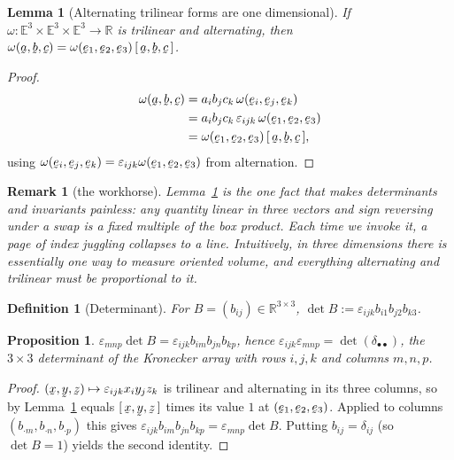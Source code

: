 \documentclass[17pt,a4paper]{extreport}
\DeclareRobustCommand{\vek}[1]{\underaccent{\tilde}{#1}}
\newcommand{\Rn}{\mathbb{R}}
\newcommand{\Et}{\mathbb{E}^{3}}
\newcommand{\ba}{\vek{a}}
\newcommand{\bb}{\vek{b}}
\newcommand{\bc}{\vek{c}}
\newcommand{\bx}{\vek{x}}
\newcommand{\by}{\vek{y}}
\newcommand{\bz}{\vek{z}}
\newcommand{\be}{\vek{e}}
\newcommand{\dd}{\delta}
\newcommand{\eps}{\varepsilon}
\newcommand{\tbox}[3]{[\,#1,#2,#3\,]}
\theoremstyle{scplain}
\newtheorem{proposition}[theorem]{Proposition}
\newtheorem{lemma}[theorem]{Lemma}
\theoremstyle{scdefn}
\newtheorem{definition}[theorem]{Definition}
\newtheorem{remark}[theorem]{Remark}
\theoremstyle{scplain}
\begin{document}
\begin{lemma}[Alternating trilinear forms are one dimensional]\label{lem:altform}
If $\omega:\Et\times\Et\times\Et\to\Rn$ is trilinear and alternating, then
$\omega(\ba,\bb,\bc)=\omega(\be_{1},\be_{2},\be_{3})\,\tbox\ba\bb\bc$.
\end{lemma}

\begin{proof}
\[
\begin{aligned}
\omega(\ba,\bb,\bc)&=a_{i}b_{j}c_{k}\,\omega(\be_{i},\be_{j},\be_{k})\\
&=a_{i}b_{j}c_{k}\,\eps_{ijk}\,\omega(\be_{1},\be_{2},\be_{3})\\
&=\omega(\be_{1},\be_{2},\be_{3})\,\tbox\ba\bb\bc,
\end{aligned}
\]
using
$\omega(\be_{i},\be_{j},\be_{k})=\eps_{ijk}\omega(\be_1,\be_2,\be_3)$ from
alternation.
\end{proof}

\begin{remark}[the workhorse]\label{rem:workhorse}
Lemma~\ref{lem:altform} is the one fact that makes determinants and
invariants painless: \emph{any} quantity linear in three vectors and sign
reversing under a swap is a fixed multiple of the box product. Each time we
invoke it, a page of index juggling collapses to a line. Intuitively, in
three dimensions there is essentially one way to measure oriented volume,
and everything alternating and trilinear must be proportional to it.
\end{remark}

\begin{definition}[Determinant]\label{def:det}
For $B=(b_{ij})\in\Rn^{3\times3}$, $\det B:=\eps_{ijk}b_{i1}b_{j2}b_{k3}$.
\end{definition}

\begin{proposition}\label{prop:detforms}
$\eps_{mnp}\det B=\eps_{ijk}b_{im}b_{jn}b_{kp}$, hence
$\eps_{ijk}\eps_{mnp}=\det(\dd_{\bullet\bullet})$, the $3\times3$
determinant of the Kronecker array with rows $i,j,k$ and
columns $m,n,p$.
\end{proposition}

\begin{proof}
$(\bx,\by,\bz)\mapsto\eps_{ijk}x_{i}y_{j}z_{k}$ is trilinear and
alternating in its three columns, so by Lemma~\ref{lem:altform} equals
$\tbox\bx\by\bz$ times its value $1$ at $(\be_1,\be_2,\be_3)$. Applied to
columns $(b_{\cdot m},b_{\cdot n},b_{\cdot p})$ this gives
$\eps_{ijk}b_{im}b_{jn}b_{kp}=\eps_{mnp}\det B$. Putting $b_{ij}=\dd_{ij}$
(so $\det B=1$) yields the second identity.
\end{proof}
\end{document}

